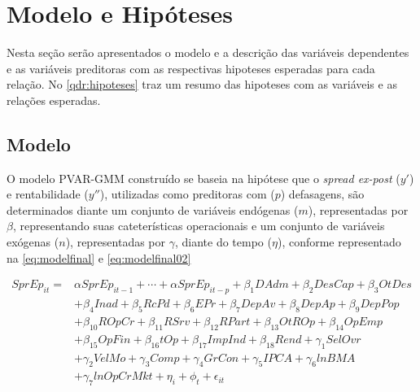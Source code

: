 \documentclass[
  12pt,
  12pt,
  openright,
  oneside,
  a4paper,
  chapter=TITLE,
  section=TITLE,
  subsection=TITLE,
  subsubsection=TITLE,
  portugues,
  sumario=tradicional]{abntex2}
\begin{document}
\section{Modelo e Hipóteses}

Nesta seção serão apresentados o modelo e a descrição das variáveis dependentes e as variáveis preditoras com as respectivas hipoteses esperadas para cada relação. No \autoref{qdr:hipoteses} traz um resumo das hipoteses com as variáveis e as relações esperadas.

\subsection{Modelo}

O modelo PVAR-GMM construído se baseia na hipótese que o \emph{spread ex-post} (\(y'\)) e rentabilidade (\(y''\)), utilizadas como preditoras com (\(p\)) defasagens, são determinados diante um conjunto de variáveis endógenas (\(m\)), representadas por \(\beta\), representando suas cateterísticas operacionais e um conjunto de variáveis exógenas (\(n\)), representadas por \(\gamma\), diante do tempo (\(\eta\)), conforme representado na \autoref{eq:modelfinal} e \autoref{eq:modelfinal02}

\begin{equation}\label{eq:modelfinal}
\begin{aligned}
SprEp_{it} = & \alpha SprEp_{it-1}+ \cdots +\alpha SprEp_{it-p} + \beta_{1}{DAdm} +  \beta_{2}{DesCap} + \beta_{3}{OtDes} \\ 
& + \beta_{4}{Inad} + \beta_{5}{RcPd} +  \beta_{6}{EPr} + \beta_{7}{DepAv} + \beta_{8}{DepAp} + \beta_{9}{DepPop} \\ 
& + \beta_{10}{ROpCr} + \beta_{11}{RSrv} + \beta_{12}{RPart} + \beta_{13}{OtROp} +  \beta_{14}{OpEmp} \\
& + \beta_{15}{OpFin} + \beta_{16}{tOp} + \beta_{17}{ImpInd} + \beta_{18}{Rend} + \gamma_{1}{SelOvr} \\
& + \gamma_{2}{VelMo} + \gamma_{3}{Comp} +  \gamma_{4}{GrCon} + \gamma_{5}{IPCA} + \gamma_{6}{lnBMA} \\
& + \gamma_{7}{lnOpCrMkt} + \eta_{i} + \phi_{t} + \epsilon_{it}   
\end{aligned}
\end{equation}
\end{document}
